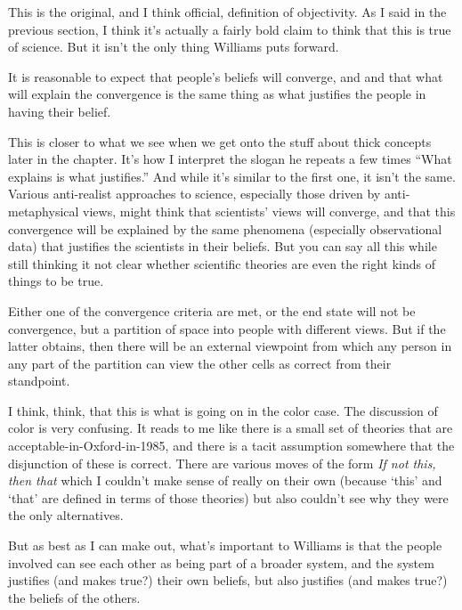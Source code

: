 \documentclass[
]{article}
\providecommand{\tightlist}{%
  \setlength{\itemsep}{0pt}\setlength{\parskip}{0pt}}
\begin{document}
This is the original, and I think official, definition of objectivity.
As I said in the previous section, I think it's actually a fairly bold
claim to think that this is true of science. But it isn't the only thing
Williams puts forward.

\begin{description}
\tightlist
\item[Convergence on Justification]
It is reasonable to expect that people's beliefs will converge, and and
that what will explain the convergence is the same thing as what
justifies the people in having their belief.
\end{description}

This is closer to what we see when we get onto the stuff about thick
concepts later in the chapter. It's how I interpret the slogan he
repeats a few times ``What explains is what justifies.'' And while it's
similar to the first one, it isn't the same. Various anti-realist
approaches to science, especially those driven by anti-metaphysical
views, might think that scientists' views will converge, and that this
convergence will be explained by the same phenomena (especially
observational data) that justifies the scientists in their beliefs. But
you can say all this while still thinking it not clear whether
scientific theories are even the right kinds of things to be true.

\begin{description}
\tightlist
\item[Co-Tenability]
Either one of the convergence criteria are met, or the end state will
not be convergence, but a partition of space into people with different
views. But if the latter obtains, then there will be an external
viewpoint from which any person in any part of the partition can view
the other cells as correct from their standpoint.
\end{description}

I think, think, that this is what is going on in the color case. The
discussion of color is very confusing. It reads to me like there is a
small set of theories that are acceptable-in-Oxford-in-1985, and there
is a tacit assumption somewhere that the disjunction of these is
correct. There are various moves of the form \emph{If not this, then
that} which I couldn't make sense of really on their own (because `this'
and `that' are defined in terms of those theories) but also couldn't see
why they were the only alternatives.

But as best as I can make out, what's important to Williams is that the
people involved can see each other as being part of a broader system,
and the system justifies (and makes true?) their own beliefs, but also
justifies (and makes true?) the beliefs of the others.
\end{document}
